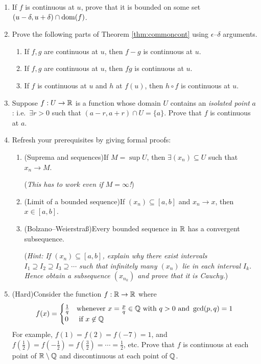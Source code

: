 \begin{exercises}
\begin{enumerate}
		
		\item If $f$ is continuous at $u$, prove that it is bounded on some set $(u-\delta,u+\delta)\cap \operatorname{dom}(f)$.
	
	
		\item Prove the following parts of Theorem \ref{thm:commoncont} using $\epsilon$--$\delta$ arguments.
		\begin{enumerate}
	  	\item If $f,g$ are continuous at $u$, then $f-g$ is continuous at $u$.
	  	\item If $f,g$ are continuous at $u$, then $fg$ is continuous at $u$.
	  	\item If $f$ is continuous at $u$ and $h$ at $f(u)$, then $h\circ f$ is continuous at $u$.
		\end{enumerate}
	  
	  
	  \item\label{exs:isolatedcont} Suppose $f:U\to \mathbb{R}$ is a function whose domain $U$ contains an \emph{isolated point} $a$: i.e.\ $\exists r>0$ such that $(a-r,a+r)\cap U=\{a\}$. Prove that $f$ is continuous at $a$.
	  
	  
	  \item\label{exs:extremevaluelemma} Refresh your prerequisites by giving formal proofs:
	  \begin{enumerate}
	    \item (Suprema and sequences)\lstsp If $M=\sup U$, then $\exists (x_n)\subseteq U$ such that $x_n\to M$.\par
	    (\emph{This has to work even if $M=\infty$!})
	    \item (Limit of a bounded sequence)\lstsp If $(x_n)\subseteq[a,b]$ and $x_n\to x$, then $x\in [a,b]$.
			\item (Bolzano--Weierstraß)\lstsp Every bounded sequence in $\mathbb{R}$ has a convergent subsequence.\par
			(\emph{Hint: If $(x_n)\subseteq [a,b]$, explain why there exist intervals $I_1\supseteq I_2\supseteq I_3\supseteq\cdots$ such that \emph{infinitely many} $(x_n)$ lie in each interval $I_k$. Hence obtain a subsequence $(x_{n_k})$ and prove that it is \emph{Cauchy.}\footnotemark})
		\end{enumerate}
		
		
		\item (Hard)\lstsp Consider the function $f:\mathbb{R}\to\mathbb{R}$ where
		\[
			f(x)=
			\begin{cases}
				\frac 1q&\text{whenever }x=\frac pq\in\mathbb{Q}\text{ with }q>0\text{ and }\gcd(p,q)=1\\
				0&\text{ if }x\not\in\mathbb{Q}
			\end{cases}
		\]
	  For example, $f(1)=f(2)=f(-7)=1$, and $f(\tfrac 12)=f(-\tfrac 12)=f(\tfrac 32)=\cdots=\frac 12$, etc. Prove that $f$ is continuous at each point of $\mathbb{R}\setminus\mathbb{Q}$ and discontinuous at each point of $\mathbb{Q}$.
	\end{enumerate}
\end{exercises}

